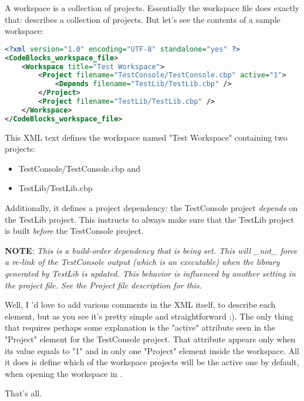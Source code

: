 A workspace is a collection of projects. Essentially the workspace file does exactly that: describes a collection of projects. But let's see the contents of a sample workspace:

\begin{lstlisting}[language=XML]
<?xml version="1.0" encoding="UTF-8" standalone="yes" ?>
<CodeBlocks_workspace_file>
	<Workspace title="Test Workspace">
		<Project filename="TestConsole/TestConsole.cbp" active="1">
			<Depends filename="TestLib/TestLib.cbp" />
		</Project>
		<Project filename="TestLib/TestLib.cbp" />
	</Workspace>
</CodeBlocks_workspace_file>
\end{lstlisting}

This XML text defines the workspace named "Test Workspace" containing two projects:

\begin{itemize}
\item TestConsole/TestConsole.cbp and
\item TestLib/TestLib.cbp
\end{itemize}

Additionally, it defines a project dependency: the TestConsole project \textit{depends} on the TestLib project. This instructs \codeblocks to always make sure that the TestLib project is built \textit{before} the TestConsole project.

\textbf{NOTE}: \textit{This is a build-order dependency that is being set. This will \_not\_ force a re-link of the TestConsole output (which is an executable) when the library generated by TestLib is updated. This behavior is influenced by another setting in the project file. See the Project file description for this.}

Well, I 'd love to add various comments in the XML itself, to describe each element, but as you see it's pretty simple and straightforward :). The only thing that requires perhaps some explanation is the "active" attribute seen in the "Project" element for the TestConsole project. That attribute appears only when its value equals to "1" and in only one "Project" element inside the workspace. All it does is define which of the workspace projects will be the active one by default, when opening the workspace in \codeblocks.


That's all. 